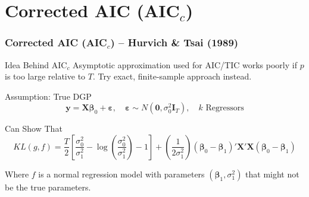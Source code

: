 \section{Corrected AIC (AIC$_c$)}
\begin{frame}
  \frametitle{Corrected AIC (AIC$_c$) -- Hurvich \& Tsai (1989)}

  \begin{block}{Idea Behind AIC$_c$}
    Asymptotic approximation used for AIC/TIC works poorly if $p$ is too large relative to $T$. \alert{Try exact, finite-sample approach instead.} 
  \end{block}

  \pause

  \begin{block}{Assumption: True DGP}
    \vspace{-1.5em}
    \[
      \mathbf{y} = \mathbf{X}\boldsymbol{\beta}_0 + \boldsymbol{\varepsilon}, \quad \boldsymbol{\varepsilon} \sim N(\mathbf{0}, \sigma_0^2 \mathbf{I}_T), \quad k \text{ Regressors}
    \]

    \pause

    \begin{block}{Can Show That}
      \vspace{-1em}
      \small
      \[
        KL(g,f) = \frac{T}{2}\left[ \frac{\sigma_0^2}{\sigma_1^2} - \log \left( \frac{\sigma_0^2}{\sigma_1^2} \right) - 1\right] + \left(\frac{1}{2\sigma_1^2}\right)(\boldsymbol{\beta}_0 - \boldsymbol{\beta}_1)' \mathbf{X}'\mathbf{X} (\boldsymbol{\beta}_0 - \boldsymbol{\beta}_1)
      \]
      \normalsize

      Where $f$ is a normal regression model with parameters $(\boldsymbol{\beta}_1, \sigma_1^2)$ that \alert{might not be the true parameters.} 
    \end{block}
    
  \end{block}
\end{frame}
